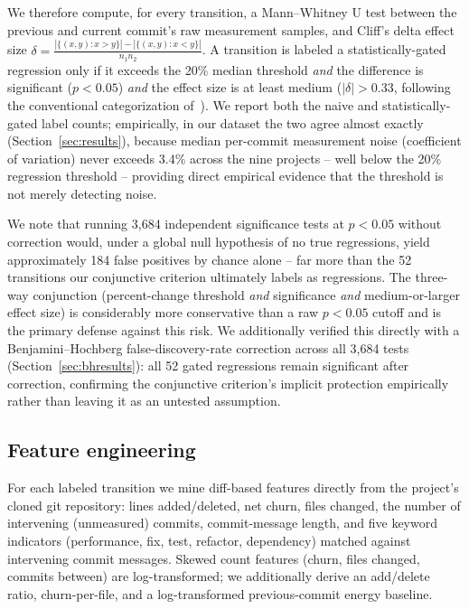 \documentclass[preprint,12pt]{elsarticle}
\begin{document}
We therefore compute, for every transition, a Mann--Whitney U test between the previous and current commit's raw measurement samples, and Cliff's delta effect size $\delta = \frac{|\{(x,y): x>y\}| - |\{(x,y): x<y\}|}{n_1 n_2}$. A transition is labeled a statistically-gated regression only if it exceeds the 20\% median threshold \emph{and} the difference is significant ($p<0.05$) \emph{and} the effect size is at least medium ($|\delta|>0.33$, following the conventional categorization of~\cite{romano2006exploring}). We report both the naive and statistically-gated label counts; empirically, in our dataset the two agree almost exactly (Section~\ref{sec:results}), because median per-commit measurement noise (coefficient of variation) never exceeds 3.4\% across the nine projects -- well below the 20\% regression threshold -- providing direct empirical evidence that the threshold is not merely detecting noise.

We note that running 3{,}684 independent significance tests at $p<0.05$ without correction would, under a global null hypothesis of no true regressions, yield approximately 184 false positives by chance alone -- far more than the 52 transitions our conjunctive criterion ultimately labels as regressions. The three-way conjunction (percent-change threshold \emph{and} significance \emph{and} medium-or-larger effect size) is considerably more conservative than a raw $p<0.05$ cutoff and is the primary defense against this risk. We additionally verified this directly with a Benjamini--Hochberg false-discovery-rate correction across all 3{,}684 tests (Section~\ref{sec:bhresults}): all 52 gated regressions remain significant after correction, confirming the conjunctive criterion's implicit protection empirically rather than leaving it as an untested assumption.

\subsection{Feature engineering}
For each labeled transition we mine diff-based features directly from the project's cloned git repository: lines added/deleted, net churn, files changed, the number of intervening (unmeasured) commits, commit-message length, and five keyword indicators (performance, fix, test, refactor, dependency) matched against intervening commit messages. Skewed count features (churn, files changed, commits between) are log-transformed; we additionally derive an add/delete ratio, churn-per-file, and a log-transformed previous-commit energy baseline.
\end{document}
